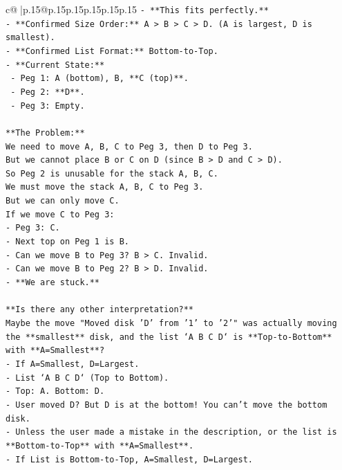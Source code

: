 \documentclass{article}
\begin{document}
{\begin{supertabular}{c@{$\;$}|p{.15\linewidth}@{}p{.15\linewidth}p{.15\linewidth}p{.15\linewidth}p{.15\linewidth}p{.15\linewidth}}
{{{\texttt{{-} **This fits perfectly.**} \\
\texttt{{-} **Confirmed Size Order:** A > B > C > D. (A is largest, D is smallest).} \\
\texttt{{-} **Confirmed List Format:** Bottom{-}to{-}Top.} \\
\texttt{{-} **Current State:**} \\
\texttt{  {-} Peg 1: A (bottom), B, **C (top)**.} \\
\texttt{  {-} Peg 2: **D**.} \\
\texttt{  {-} Peg 3: Empty.} \\
\\ 
\texttt{**The Problem:**} \\
\texttt{We need to move A, B, C to Peg 3, then D to Peg 3.} \\
\texttt{But we cannot place B or C on D (since B > D and C > D).} \\
\texttt{So Peg 2 is unusable for the stack A, B, C.} \\
\texttt{We must move the stack A, B, C to Peg 3.} \\
\texttt{But we can only move C.} \\
\texttt{If we move C to Peg 3:} \\
\texttt{{-} Peg 3: C.} \\
\texttt{{-} Next top on Peg 1 is B.} \\
\texttt{{-} Can we move B to Peg 3? B > C. Invalid.} \\
\texttt{{-} Can we move B to Peg 2? B > D. Invalid.} \\
\texttt{{-} **We are stuck.**} \\
\\ 
\texttt{**Is there any other interpretation?**} \\
\texttt{Maybe the move "Moved disk 'D' from '1' to '2'" was actually moving the **smallest** disk, and the list `A B C D` is **Top{-}to{-}Bottom** with **A=Smallest**?} \\
\texttt{{-} If A=Smallest, D=Largest.} \\
\texttt{{-} List `A B C D` (Top to Bottom).} \\
\texttt{{-} Top: A. Bottom: D.} \\
\texttt{{-} User moved D? But D is at the bottom! You can't move the bottom disk.} \\
\texttt{{-} Unless the user made a mistake in the description, or the list is **Bottom{-}to{-}Top** with **A=Smallest**.} \\
\texttt{{-} If List is Bottom{-}to{-}Top, A=Smallest, D=Largest.} \\
}}}
\end{supertabular}}
\end{document}
